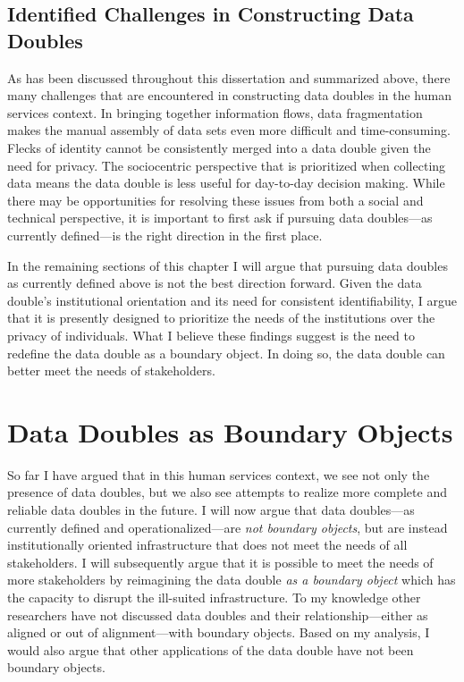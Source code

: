 \subsection{Identified Challenges in Constructing Data Doubles}
As has been discussed throughout this dissertation and summarized above, there many challenges that are encountered in constructing data doubles in the human services context. In bringing together information flows, data fragmentation makes the manual assembly of data sets even more difficult and time-consuming. Flecks of identity cannot be consistently merged into a data double given the need for privacy. The sociocentric perspective that is prioritized when collecting data means the data double is less useful for day-to-day decision making. While there may be opportunities for resolving these issues from both a social and technical perspective, it is important to first ask if pursuing data doubles---as currently defined---is the right direction in the first place.

In the remaining sections of this chapter I will argue that pursuing data doubles as currently defined above is not the best direction forward. Given the data double's institutional orientation and its need for consistent identifiability, I argue that it is presently designed to prioritize the needs of the institutions over the privacy of individuals. What I believe these findings suggest is the need to redefine the data double as a boundary object. In doing so, the data double can better meet the needs of stakeholders.

\section{Data Doubles as Boundary Objects}
So far I have argued that in this human services context, we see not only the presence of data doubles, but we also see attempts to realize more complete and reliable data doubles in the future. I will now argue that data doubles---as currently defined and operationalized---are \textit{not boundary objects}, but are instead institutionally oriented infrastructure that does not meet the needs of all stakeholders. I will subsequently argue that it is possible to meet the needs of more stakeholders by reimagining the data double \textit{as a boundary object} which has the capacity to disrupt the ill-suited infrastructure. To my knowledge other researchers have not discussed data doubles and their relationship---either as aligned or out of alignment---with boundary objects. Based on my analysis, I would also argue that other applications of the data double have not been boundary objects.

